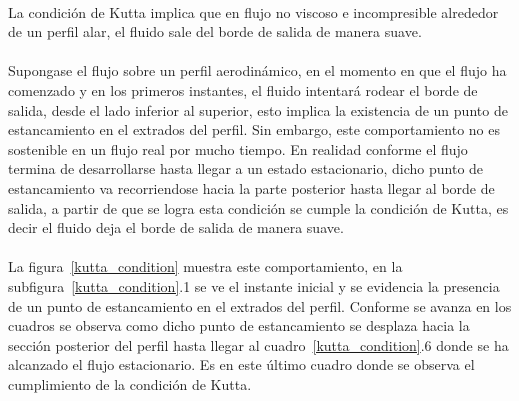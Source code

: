\documentclass[letterpaper, openright, 12pt]{book}
\begin{document}
    \paragraph*{}
        La condición de Kutta implica que en flujo no viscoso e incompresible
        alrededor de un perfil alar, el fluido sale del borde de salida de
        manera suave.

    \paragraph*{}
        Supongase el flujo sobre un perfil aerodinámico, en el momento en que
        el flujo ha comenzado y en los primeros instantes, el fluido intentará
        rodear el borde de salida, desde el lado inferior al superior, esto
        implica la existencia de un punto de estancamiento en el extrados del
        perfil. Sin embargo, este comportamiento no es sostenible en un flujo
        real por mucho tiempo. En realidad conforme el flujo termina de
        desarrollarse hasta llegar a un estado estacionario, dicho punto de
        estancamiento va recorriendose hacia la parte posterior hasta llegar al
        borde de salida, a partir de que se logra esta condición se cumple la
        condición de Kutta, es decir el fluido deja el borde de salida de
        manera suave.

    \paragraph*{}
        La figura~\ref{kutta_condition} muestra este comportamiento, en la
        subfigura~\ref{kutta_condition}.1 se ve el instante inicial y se
        evidencia la presencia de un punto de estancamiento en el extrados del
        perfil. Conforme se avanza en los cuadros se observa como dicho punto de
        estancamiento se desplaza hacia la sección posterior del perfil hasta
        llegar al cuadro~\ref{kutta_condition}.6 donde se ha alcanzado el flujo
        estacionario. Es en este último cuadro donde se observa el cumplimiento
        de la condición de Kutta.
\end{document}
